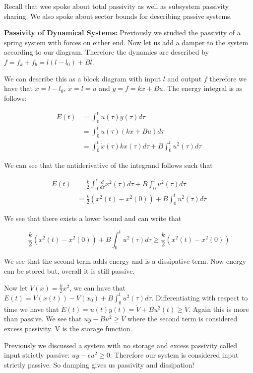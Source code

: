 \documentclass[11pt]{article}
\begin{document}
Recall that wee spoke about total passivity as well as subsystem passivity sharing. We also spoke about sector bounds for describing passive systems.

\textbf{Passivity of Dynamical Systems: } Previously we studied the passivity of a spring system with forces on either end. Now let us add a damper to the system according to our diagram. Therefore the dynamics are described by $f = f_k + f_b = l(l-l_0) + B\dot{l}$.

 We can describe this as a block diagram with input $\dot{l}$ and output $f$ therefore we have that $x = l-l_0$, $\dot{x} = \dot{l} = u$ and $y = f = kx + Bu$. The energy integral is as follows:

 \begin{align}
 	E(t) &= \int_0^t u(\tau)y(\tau) d\tau \\
 	&= \int_0^t u(\tau)(kx + Bu)d\tau \\
 	&= \int_0^t \dot{x}(\tau)kx(\tau)d\tau + B\int_0^t u^2(\tau)d\tau
 \end{align}

 We can see that the antiderivative of the integrand follows such that 

 \begin{align}
 	E(t) &= \frac{k}{2} \int_0^t \frac{d}{d\tau}x^2(\tau)d\tau + B\int_0^t u^2(\tau)d\tau \\ 
 	&= \frac{k}{2}(x^2(t) - x^2(0)) + B\int_0^t u^2(\tau)d\tau 
 \end{align}

 We see that there exists a lower bound and can write that

 \begin{equation}
 	 \frac{k}{2}(x^2(t) - x^2(0)) + B\int_0^t u^2(\tau)d\tau \geq \frac{k}{2}(x^2(t) - x^2(0))
 \end{equation}

 We see that the second term adds energy and is a dissipative term. Now energy can be stored but, overall it is still passive.

 Now let $V(x) = \frac{k}{2}x^2$, we can have that $E(t) = V(x(t)) - V(x_0) + B\int_0^t u^2(\tau)d\tau $. Differentiating with respect to time we have that $\dot{E}(t) = u(t)y(t) = \dot{V} + Bu^2(t) \geq \dot{V} $. Again this is more than passive. We see that $uy -Bu^2 \geq \dot{V}$ where the second term is considered excess passivity. V is the storage function.

 Previously we discussed a system with no storage and excess passivity called input strictly passive: $uy - \epsilon u^2 \geq 0$. Therefore our system is considered input strictly passive. So damping gives us passivity and dissipation!
\end{document}
